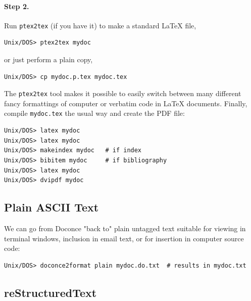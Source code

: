 \documentclass{article}
\begin{document}
\paragraph{Step 2.}
Run {\fontsize{10pt}{10pt}\verb!ptex2tex!} (if you have it) to make a standard {\LaTeX} file,
\begin{Verbatim}[fontsize=\fontsize{9pt}{9pt},tabsize=8,baselinestretch=0.85,
fontfamily=tt,xleftmargin=7mm]
Unix/DOS> ptex2tex mydoc
\end{Verbatim}
\noindent
or just perform a plain copy,
\begin{Verbatim}[fontsize=\fontsize{9pt}{9pt},tabsize=8,baselinestretch=0.85,
fontfamily=tt,xleftmargin=7mm]
Unix/DOS> cp mydoc.p.tex mydoc.tex
\end{Verbatim}
\noindent
The {\fontsize{10pt}{10pt}\verb!ptex2tex!} tool makes it possible to easily switch between many
different fancy formattings of computer or verbatim code in {\LaTeX}
documents.
Finally, compile {\fontsize{10pt}{10pt}\verb!mydoc.tex!} the usual way and create the PDF file:
\begin{Verbatim}[fontsize=\fontsize{9pt}{9pt},tabsize=8,baselinestretch=0.85,
fontfamily=tt,xleftmargin=7mm]
Unix/DOS> latex mydoc
Unix/DOS> latex mydoc
Unix/DOS> makeindex mydoc   # if index
Unix/DOS> bibitem mydoc     # if bibliography
Unix/DOS> latex mydoc
Unix/DOS> dvipdf mydoc
\end{Verbatim}
\noindent

\subsection{Plain ASCII Text}

We can go from Doconce "back to" plain untagged text suitable for viewing
in terminal windows, inclusion in email text, or for insertion in
computer source code:
\begin{Verbatim}[fontsize=\fontsize{9pt}{9pt},tabsize=8,baselinestretch=0.85,
fontfamily=tt,xleftmargin=7mm]
Unix/DOS> doconce2format plain mydoc.do.txt  # results in mydoc.txt
\end{Verbatim}
\noindent

\subsection{reStructuredText}
\end{document}
